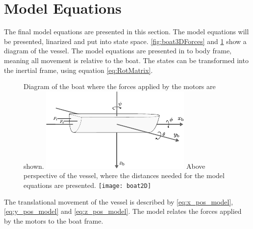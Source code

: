 \section{Model Equations}   
The final model equations are presented in this section.
The model equations will be presented, linarized and put into state space.
\autoref{fig:boat3DForces} and \ref{fig:boat2D} show a diagram of the vessel.
The model equations are presented in to body frame, meaning all movement is relative to the boat. 
The states can be transformed into the inertial frame, using equation \autoref{eq:RotMatrix}.  
\begin{figure}[H]
    \captionbox  %
    {               %
        Diagram of the boat where the forces applied by the motors are shown.                %
        \label{fig:boat3DForces}                                  %
    }                                                                 %
    {                                                                  %
        \includegraphics[width=.46\textwidth]{figures/boat3DForces}         %
    }                                                                    %
    \hspace{5pt}                                                          %
    \captionbox  %
    {       
        Above perspective of the vessel, where the distances needed for the model equations are presented.                                                                %
        \label{fig:boat2D}                                     %
    }                                                                           %
    {                                                                            %
        \texttt{[image: boat2D]}            %
    }                                                                             %
\end{figure}
%
The translational movement of the vessel is described by \autoref{eq:x_pos_model}, \ref{eq:y_pos_model} and \ref{eq:z_pos_model}.
The model relates the forces applied by the motors to the boat frame. 
